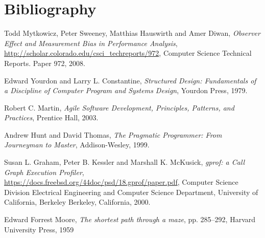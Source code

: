 \chapter{Bibliography}
\begin{thebibliography}{9}
              
  Todd Mytkowicz, Peter Sweeney, Matthias Hauswirth and Amer Diwan,
  \emph{Observer Effect and Measurement Bias in Performance Analysis},
  \url{http://scholar.colorado.edu/csci_techreports/972},
  Computer Science Technical Reports. Paper 972,
  2008.
        
  Edward Yourdon and Larry L. Constantine,
  \emph{Structured Design: Fundamentals of a Discipline of Computer Program and Systems Design},
  Yourdon Press,
  1979.
      
  Robert C. Martin,
  \emph{Agile Software Development, Principles, Patterns, and Practices},
  Prentice Hall,
  2003.
      
  Andrew Hunt and David Thomas,
  \emph{The Pragmatic Programmer: From Journeyman to Master},
  Addison-Wesley,
  1999.
              
  Susan L. Graham, Peter B. Kessler and Marshall K. McKusick,
  \emph{gprof: a Call Graph Execution Profiler},
  \url{https://docs.freebsd.org/44doc/psd/18.gprof/paper.pdf},
  Computer Science Division Electrical Engineering and Computer Science Department, University of California, Berkeley Berkeley, California,
  2000.
  
  Edward Forrest Moore,
  \emph{The shortest path through a maze},
  pp. 285–292,
  Harvard University Press,
  1959
\end{thebibliography}